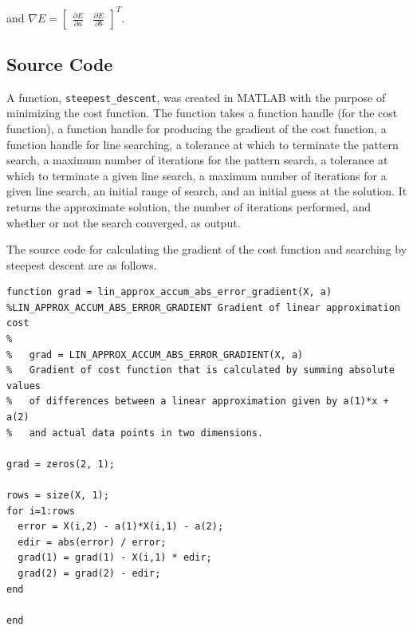 \documentclass{article}
\begin{document}
and $\nabla E = \begin{bmatrix} \frac{\partial E}{\partial a} & \frac{\partial E}{\partial b} \end{bmatrix}^T$.

\subsection{Source Code}

A function, \texttt{steepest\_descent}, was created in MATLAB with the purpose of minimizing the cost function.
The function takes a function handle (for the cost function), a function handle for producing the gradient of the cost function, a function handle for line searching, a tolerance at which to terminate the pattern search, a maximum number of iterations for the pattern search, a tolerance at which to terminate a given line search, a maximum number of iterations for a given line search, an initial range of search, and an initial guess at the solution.
It returns the approximate solution, the number of iterations performed, and whether or not the search converged, as output.

The source code for calculating the gradient of the cost function and searching by steepest descent are as follows.

\vspace{0.25in}
\begin{lstlisting}
function grad = lin_approx_accum_abs_error_gradient(X, a)
%LIN_APPROX_ACCUM_ABS_ERROR_GRADIENT Gradient of linear approximation cost
%
%   grad = LIN_APPROX_ACCUM_ABS_ERROR_GRADIENT(X, a)
%   Gradient of cost function that is calculated by summing absolute values
%   of differences between a linear approximation given by a(1)*x + a(2) 
%   and actual data points in two dimensions.

grad = zeros(2, 1);

rows = size(X, 1);
for i=1:rows
  error = X(i,2) - a(1)*X(i,1) - a(2);
  edir = abs(error) / error;
  grad(1) = grad(1) - X(i,1) * edir;
  grad(2) = grad(2) - edir;
end

end

\end{lstlisting}

\vspace{0.25in}
\end{document}
